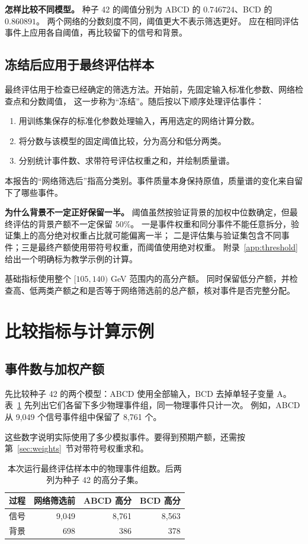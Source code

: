\documentclass[11pt,a4paper,fontset=fandol,scheme=plain]{ctexart}
\begin{document}
\textbf{怎样比较不同模型。} 种子 42 的阈值分别为 ABCD 的 $0.746724$、BCD 的 $0.860891$。
两个网络的分数刻度不同，阈值更大不表示筛选更好。
应在相同评估事件上应用各自阈值，再比较留下的信号和背景。

\subsection{冻结后应用于最终评估样本}

最终评估用于检查已经确定的筛选方法。开始前，先固定输入标准化参数、网络检查点和分数阈值，
这一步称为“冻结”。随后按以下顺序处理评估事件：
\begin{enumerate}[leftmargin=1.7em,itemsep=2pt,topsep=3pt]
\item 用训练集保存的标准化参数处理输入，再用选定的网络计算分数。
\item 将分数与该模型的固定阈值比较，分为高分和低分两类。
\item 分别统计事件数、求带符号评估权重之和，并绘制质量谱。
\end{enumerate}
本报告的“网络筛选后”指高分类别。事件质量本身保持原值，质量谱的变化来自留下了哪些事件。

\textbf{为什么背景不一定正好保留一半。}
阈值虽然按验证背景的加权中位数确定，但最终评估的背景产额不一定保留 50\%。
一是事件权重和同分事件不能任意拆分，验证集上的高分绝对权重占比就可能偏离一半；
二是评估集与验证集包含不同事件；三是最终产额使用带符号权重，而阈值使用绝对权重。
附录~\ref{app:threshold} 给出一个明确标为教学示例的计算。

基础指标使用整个 $[105,140)$ GeV 范围内的高分产额。
同时保留低分产额，并检查高、低两类产额之和是否等于网络筛选前的总产额，核对事件是否完整分配。

\section{比较指标与计算示例}\label{sec:basic}

\subsection{事件数与加权产额}
先比较种子 42 的两个模型：ABCD 使用全部输入，BCD 去掉单轻子变量 A。
表~\ref{tab:groups} 先列出它们各留下多少物理事件组，同一物理事件只计一次。
例如，ABCD 从 9,049 个信号事件组中保留了 8,761 个。

这些数字说明实际使用了多少模拟事件。要得到预期产额，还需按第~\ref{sec:weights}~节对带符号权重求和。
\begin{table}[H]
\caption{本次运行最终评估样本中的物理事件组数。后两列为种子 42 的高分子集。}
\label{tab:groups}
\centering
\begin{tabular}{lrrr}
\toprule
过程 & 网络筛选前 & ABCD 高分 & BCD 高分 \\
\midrule
信号 & 9,049 & 8,761 & 8,563 \\
背景 & 698 & 386 & 378 \\
\bottomrule
\end{tabular}
\end{table}
\end{document}
